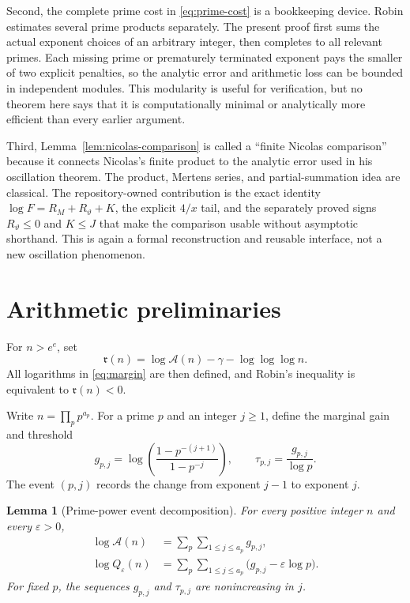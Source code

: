 \documentclass[11pt]{amsart}
\newtheorem{lemma}[theorem]{Lemma}
\theoremstyle{definition}
\theoremstyle{remark}
\numberwithin{equation}{section}
\newcommand{\euler}{\gamma}
\newcommand{\A}{\mathcal{A}}
\newcommand{\M}{\mathfrak r}
\newcommand{\eps}{\varepsilon}
\begin{document}
Second, the complete prime cost in \eqref{eq:prime-cost} is a
bookkeeping device.  Robin estimates several prime products separately.  The
present proof first sums the actual exponent choices of an arbitrary integer,
then completes to all relevant primes.  Each missing prime or prematurely
terminated exponent pays the smaller of two explicit penalties, so the
analytic error and arithmetic loss can be bounded in independent modules.
This modularity is useful for verification, but no theorem here says that it
is computationally minimal or analytically more efficient than every earlier
argument.

Third, Lemma~\ref{lem:nicolas-comparison} is called a ``finite Nicolas
comparison'' because it connects Nicolas's finite product to the analytic
error used in his oscillation theorem.  The product, Mertens series, and
partial-summation idea are classical.  The repository-owned contribution is
the exact identity
$\log F=R_M+R_\vartheta+K$, the explicit $4/x$ tail, and the separately proved
signs $R_\vartheta\le0$ and $K\le J$ that make the comparison usable without
asymptotic shorthand.  This is again a formal reconstruction and reusable
interface, not a new oscillation phenomenon.

\section{Arithmetic preliminaries}

For $n>e^e$, set
\begin{equation}\label{eq:margin}
  \M(n)=\log \A(n)-\euler-\log\log\log n.
\end{equation}
All logarithms in \eqref{eq:margin} are then defined, and Robin's inequality
is equivalent to $\M(n)<0$.

Write $n=\prod_p p^{a_p}$.  For a prime $p$ and an integer $j\ge1$, define
the marginal gain and threshold
\begin{equation}\label{eq:event}
  g_{p,j}
  =\log\!\left(\frac{1-p^{-(j+1)}}{1-p^{-j}}\right),
  \qquad
  \tau_{p,j}=\frac{g_{p,j}}{\log p}.
\end{equation}
The event $(p,j)$ records the change from exponent $j-1$ to exponent $j$.

\begin{lemma}[Prime-power event decomposition]\label{lem:event-decomp}
For every positive integer $n$ and every $\eps>0$,
\begin{align}
  \log \A(n)
    &=\sum_p\sum_{1\le j\le a_p}g_{p,j},\label{eq:event-abundancy}\\
  \log Q_{\eps}(n)
    &=\sum_p\sum_{1\le j\le a_p}
       \bigl(g_{p,j}-\eps\log p\bigr).\label{eq:event-ca}
\end{align}
For fixed $p$, the sequences $g_{p,j}$ and $\tau_{p,j}$ are nonincreasing in
$j$.
\end{lemma}
\end{document}
